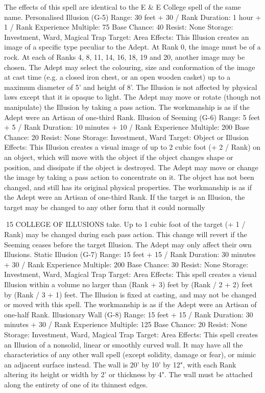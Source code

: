 \documentclass[a4paper]{article}
\begin{document}
\begin{multicols}{3}
The effects of this spell are identical to the E & E
College spell of the same name.
Personalised Illusion (G-5)
Range: 30 feet + 30 / Rank
Duration: 1 hour + 1 / Rank
Experience Multiple: 75
Base Chance: 40%
Resist: None
Storage: Investment, Ward, Magical Trap
Target: Area
Effects: This Illusion creates an image of a specific
type peculiar to the Adept. At Rank 0, the image
must be of a rock. At each of Ranks 4, 8, 11, 14,
16, 18, 19 and 20, another image may be chosen.
The Adept may select the colouring, size and conformation of the image at cast time (e.g. a closed
iron chest, or an open wooden casket) up to a
maximum diameter of 5’ and height of 8’. The
Illusion is not affected by physical laws except that
it is opaque to light. The Adept may move or rotate
(though not manipulate) the Illusion by taking a
pass action. The workmanship is as if the Adept
were an Artisan of one-third Rank.
Illusion of Seeming (G-6)
Range: 5 feet + 5 / Rank
Duration: 10 minutes + 10 / Rank
Experience Multiple: 200
Base Chance: 20%
Resist: None
Storage: Investment, Ward
Target: Object or Illusion
Effects: This Illusion creates a visual image of up
to 2 cubic foot (+ 2 / Rank) on an object, which
will move with the object if the object changes
shape or position, and dissipate if the object is
destroyed. The Adept may move or change the
image by taking a pass action to concentrate on it.
The object has not been changed, and still has its
original physical properties. The workmanship is
as if the Adept were an Artisan of one-third Rank.
If the target is an Illusion, the target may be
changed to any other form that it could normally

15 COLLEGE OF ILLUSIONS
take. Up to 1 cubic foot of the target (+ 1 / Rank)
may be changed during each pass action. This
change will revert if the Seeming ceases before the
target Illusion. The Adept may only affect their
own Illusions.
Static Illusion (G-7)
Range: 15 feet + 15 / Rank
Duration: 30 minutes + 30 / Rank
Experience Multiple: 200
Base Chance: 30%
Resist: None
Storage: Investment, Ward, Magical Trap
Target: Area
Effects: This spell creates a visual Illusion within a
volume no larger than (Rank + 3) feet by (Rank / 2
+ 2) feet by (Rank
/ 3 + 1) feet. The Illusion is fixed at casting, and
may not be changed or moved with this spell. The
workmanship is as if the Adept were an Artisan of
one-half Rank.
Illusionary Wall (G-8)
Range: 15 feet + 15 / Rank
Duration: 30 minutes + 30 / Rank
Experience Multiple: 125
Base Chance: 20%
Resist: None
Storage: Investment, Ward, Magical Trap
Target: Area
Effects: This spell creates an Illusion of a nonsolid, linear or smoothly curved wall. It may have
all the characteristics of any other wall spell (except solidity, damage or fear), or mimic an adjacent
surface instead. The wall is 20’ by 10’ by 12", with
each Rank altering its height or width by 2’ or
thickness by 4". The wall must be attached along
the entirety of one of its thinnest edges.


\end{multicols}
\end{document}
